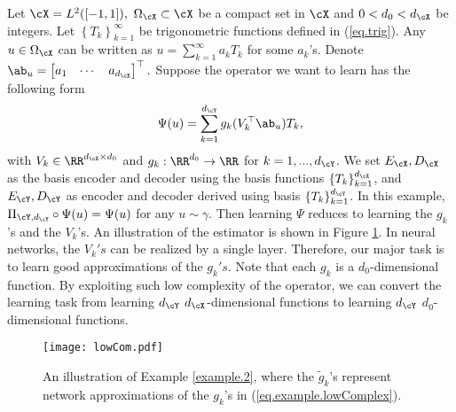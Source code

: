 \documentclass[11pt]{article} %
\begin{document}
\begin{example}\label{example.2}
	Let $\cX=L^2([-1,1]),\ \Omega_{\cX}\subset \cX$ be a compact set in $\cX$ and $0<d_0<d_{\cX}$ be integers. Let $\left\{T_k\right\}_{k=1}^{\infty}$ be trigonometric functions defined in (\ref{eq.trig}). Any $u\in \Omega_{\cX}$ can be written as $u=\sum_{k=1}^{\infty} a_kT_k$ for some $a_k$'s. Denote $\ab_u=\begin{bmatrix}
		a_1 & \cdots & a_{d_{\cX}}
	\end{bmatrix}^{\top}.$ Suppose the operator we want to learn has the following form
	\begin{align}
		\Psi(u)=\sum_{k=1}^{d_{\cY}} g_k(V_k^{\top}\ab_u)T_k,
		\label{eq.example.lowComplex}
	\end{align}
	with $V_k\in \RR^{d_{\cX}\times d_0 }$ and $g_k: \RR^{d_0}\rightarrow \RR$ for $k=1,...,d_{\cY}$. We set $E_{\cX},D_{\cX}$ as the basis encoder and decoder using the basis functions $\{T_k\}_{k=1}^{d_{\cX}}$, and  $E_{\cY},D_{\cY}$ as encoder and decoder derived using basis $\{T_k\}_{k=1}^{d_{\cY}}$. In this example, $\Pi_{\cY,d_{\cY}}\circ\Psi(u)=\Psi(u)$ for any $u\sim \gamma$. Then learning $\Psi$ reduces to learning the $g_k$'s and the $V_k$'s. An illustration of the estimator is shown in Figure \ref{fig.ex.lowCom}. In neural networks, the $V_k's$ can be realized by a single layer. Therefore, our major task is to learn good  approximations of the $g_k's$. Note that each $g_k$ is a $d_0$-dimensional function. By exploiting such low complexity of the operator, we can convert the learning task from learning $d_{\cY}$ $d_{\cX}$-dimensional functions to learning $d_{\cY}$ $d_0$-dimensional functions.  %
	\begin{figure}[ht!]
		\centering
		\texttt{[image: lowCom.pdf]}
		\caption{An illustration of Example \ref{example.2}, where the $\widetilde{g}_k$'s represent network approximations of the $g_k$'s in (\ref{eq.example.lowComplex}). %
		}
		\label{fig.ex.lowCom}
	\end{figure}
	
	
\end{example}
\end{document}
